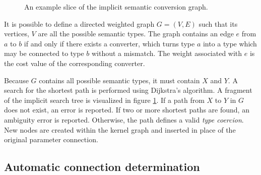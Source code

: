 \begin{figure}[h!]
  \centering
    \caption[Implicit semantic search tree]{An example slice of the implicit semantic conversion graph.}
  \label{fig:SemanticSearchGraph}
\end{figure}

It is possible to define a directed weighted graph $G=(V, E)$ such that its vertices, $V$ are all the possible semantic types. The graph contains an edge $e$ from $a$ to $b$ if and only if there exists a converter, which turns type $a$ into a type which may be connected to type $b$ without a mismatch. The weight associated with $e$ is the cost value of the corresponding converter.

Because $G$ contains all possible semantic types, it must contain $X$ and $Y$. A search for the shortest path is performed using Dijkstra's algorithm. A fragment of the implicit search tree is visualized in figure \ref{fig:SemanticSearchGraph}. If a path from $X$ to $Y$ in $G$ does not exist, an error is reported. If two or more shortest paths are found, an ambiguity error is reported. Otherwise, the path defines a valid \emph{type coercion}. New nodes are created within the kernel graph and inserted in place of the original parameter connection.
	
\subsection{Automatic connection determination}

